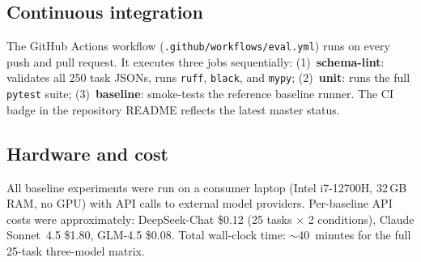 \subsection{Continuous integration}

The GitHub Actions workflow
(\texttt{.github/workflows/eval.yml}) runs on every push and pull
request. It executes three jobs sequentially:
(1)~\textbf{schema-lint}: validates all 250 task JSONs, runs
\texttt{ruff}, \texttt{black}, and \texttt{mypy};
(2)~\textbf{unit}: runs the full \texttt{pytest} suite;
(3)~\textbf{baseline}: smoke-tests the reference baseline runner.
The CI badge in the repository README reflects the latest master status.

\subsection{Hardware and cost}

All baseline experiments were run on a consumer laptop
(Intel i7-12700H, 32\,GB RAM, no GPU) with API calls to external
model providers. Per-baseline API costs were approximately:
DeepSeek-Chat \$0.12 (25 tasks $\times$ 2 conditions),
Claude Sonnet~4.5 \$1.80, GLM-4.5 \$0.08.
Total wall-clock time: $\sim$40~minutes for the full 25-task
three-model matrix.
